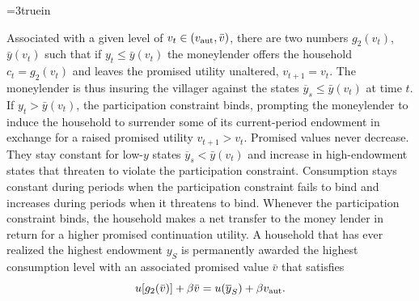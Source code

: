 
\centerline{\epsfxsize=3truein}
\caption{The shape of consumption as a function of realized endowment, when the promised
initial value is $v$.}
\endfigure

 Associated with a given level of $v_t \in
(v_{\rm aut}, \bar v)$, there are two numbers $g_2(v_t)$, $\bar y(v_t)$
such that
 if $y_t \leq \bar y(v_t)$
 the moneylender offers the household $c_t=g_2(v_t)$
and  leaves the promised utility unaltered, $v_{t+1}=v_t$.
The moneylender is thus insuring the villager against the
states $\overline y_s \leq \bar y(v_t)$ at time $t$.
If $y_t > \bar y(v_t)$, the participation constraint  binds,
prompting the moneylender to induce the household
to surrender some of its current-period
endowment in exchange for a raised promised utility
$v_{t+1} > v_t$.  Promised values never decrease.  They stay constant
for low-$y$ states $\overline y_s < \bar y(v_t)$ and
increase in high-endowment states that threaten
to violate the participation constraint.  Consumption stays constant
during periods when the participation constraint fails to bind
and increases  during periods when it threatens to bind. Whenever the participation constraint binds, the household makes a net transfer
to the money lender in return for a higher promised continuation utility.  A household that has ever realized the highest endowment $y_S$ is
permanently awarded the highest consumption level with an
associated promised value $\bar v$ that satisfies
$$u[g_2(\bar v)] + \beta \bar v = u(\overline y_S) + \beta v_{\rm aut}.$$

